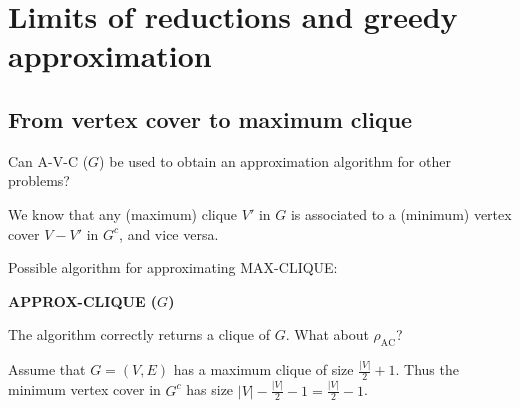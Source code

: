 \section{Limits of reductions and greedy approximation}
\subsection{From vertex cover to maximum clique}
Can A-V-C ($G$) be used to obtain an approximation algorithm for other problems?

We know that any (maximum) clique $V'$ in $G$ is associated to a (minimum) vertex cover $V-V'$ in $G^c$, and vice versa.

Possible algorithm for approximating MAX-CLIQUE:
\begin{notesalgorithm}
\textbf{APPROX-CLIQUE ($G$)}
\begin{notespseudocode}
\end{notespseudocode}
\end{notesalgorithm}
The algorithm correctly returns a clique of $G$. What about $\rho_{\mathrm{AC}}$?

Assume that $G=(V,E)$ has a maximum clique of size $\frac{|V|}{2}+1$. Thus the minimum vertex cover in $G^c$ has size $|V|-\frac{|V|}{2}-1=\frac{|V|}{2}-1$.
